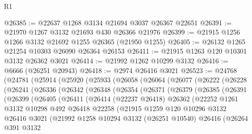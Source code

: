 \begin{lexlean}{R1}
\begin{coremodule}
@26385 := @22637 @1268 @3134 @21694 @3037 @26367 @22651
@26391 := @21970 @1267 @3132 @21693 @430 @26366 @21976
@26399 := @21915 @1256 @1266 @3132 @21692 @1255 @26365 (@21950 @1255)
@26405 := @26132 @1265 @21254 @10303 @26090 @26364 @26153
@26411 := @21915 @1263 @120 @10301 @3132 @26362 @3021
@26414 := @21992 @1262 @10299 @3132
@26416 := @6666 (@26251 @20943)
@26418 := @2974 @26416 @3021
@26523 := @24768
    (@24781
      (@25914
        (@25920
          (@25933
            (@26058
              (@26064
                (@26077
                  (@26222
                    (@26228
                      (@26241
                        (@26336
                          (@26342
                            (@26348
                              (@26354
                                (@26371
                                  (@26379
                                    (@26385
                                      (@26391
                                        (@26399
                                          (@26405
                                            (@26411
                                              (@26414
                                                (@22237 @26418)
                                                @26362
                                                (@22252
                                                  @1261
                                                  @3132
                                                  @10298
                                                  @492
                                                  @26418
                                                  @22258
                                                  (@21915
                                                    @1259
                                                    @120
                                                    @10296
                                                    @3132
                                                    @26416
                                                    @3021
                                                    (@21992
                                                      @1258
                                                      @10294
                                                      @3132
                                                      (@26251 @10540)
                                                      @26416
                                                      (@26264
                                                        @391
                                                        @3132

\end{coremodule}
\end{lexlean}
